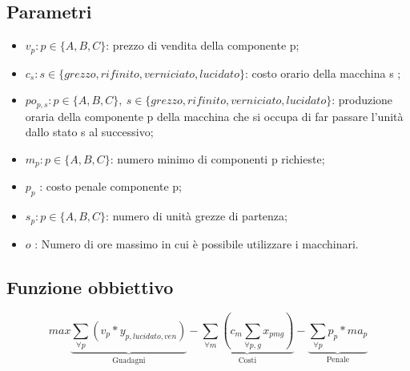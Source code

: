 \documentclass[12pt]{article}
\begin{document}
	\subsection{Parametri}
	\begin{itemize}
		\item \( v_p : p \in \{A, B, C\} \): prezzo di vendita della componente p;
		\item \( c_s : s \in \{grezzo, rifinito, verniciato, lucidato\} \): costo orario della macchina s ;
		\item \( po_{p,s} : p \in \{A, B, C\},\ s \in \{grezzo, rifinito, verniciato, lucidato\}\): produzione oraria della componente p della macchina che si occupa di far passare l'unità dallo stato s al successivo;
		\item \( m_p : p \in \{A, B, C\}\): numero minimo di componenti p richieste;
		\item \(p_p\) : costo penale componente p;
		\item \(s_p : p \in \{A, B, C\} \): numero di unità grezze di partenza;
		\item \(o \) : Numero di ore massimo in cui è possibile utilizzare i macchinari.
	\end{itemize}
	\subsection{Funzione obbiettivo}
	$$
		max 
		\underbrace{\sum\limits_{\forall p} (v_p*y_{p,lucidato,ven})}_\textrm{Guadagni}
		-
		\underbrace{\sum\limits_{\forall m}(c_m \sum\limits_{\forall p,g}x_{pmg})}_\textrm{Costi}
		-
		\underbrace{\sum\limits_{\forall p}p_p*ma_p}_\textrm{Penale}
	$$
\end{document}
